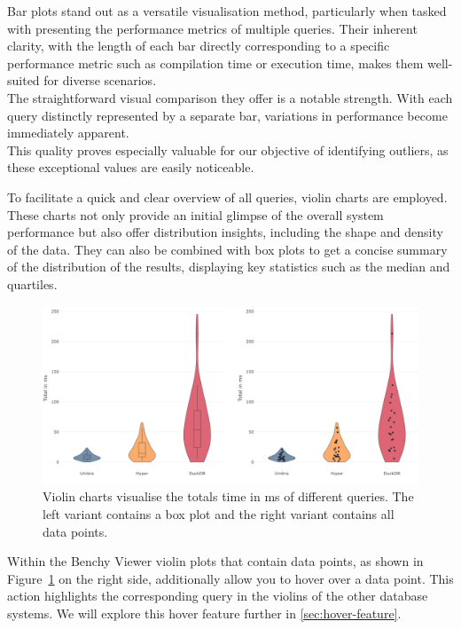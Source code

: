 Bar plots stand out as a versatile visualisation method, particularly when tasked with presenting the performance metrics of multiple queries. Their inherent clarity, with the length of each bar directly corresponding to a specific performance metric such as compilation time or execution time, makes them well-suited for diverse scenarios.\\
The straightforward visual comparison they offer is a notable strength. With each query distinctly represented by a separate bar, variations in performance become immediately apparent.\\
This quality proves especially valuable for our objective of identifying outliers, as these exceptional values are easily noticeable.

To facilitate a quick and clear overview of all queries, violin charts are employed. These charts not only provide an initial glimpse of the overall system performance but also offer distribution insights, including the shape and density of the data. They can also be combined with box plots to get a concise summary of the distribution of the results, displaying key statistics such as the median and quartiles.

\begin{figure}[h]
    \centering
    \includegraphics[width=1\linewidth]{figures/bsp-violin-boxplot-points.png}
    \caption{Violin charts visualise the totals time in ms of different queries. The left variant contains a box plot and the right variant contains all data points.}
    \label{fig:violin-chart}
  \end{figure}

Within the Benchy Viewer violin plots that contain data points, as shown in Figure~\ref{fig:violin-chart} on the right side, additionally allow you to hover over a data point. This action highlights the corresponding query in the violins of the other database systems. We will explore this hover feature further in \ref{sec:hover-feature}.


